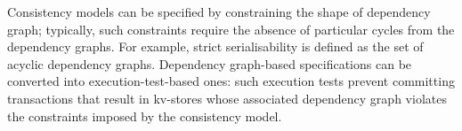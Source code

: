 Consistency models can be specified by constraining the shape of dependency graph; typically, such constraints require the absence of particular cycles 
from the dependency graphs. 
For example, strict serialisability is defined as the set of acyclic dependency graphs. %
Dependency graph-based specifications can be converted into execution-test-based ones: such execution 
tests prevent committing transactions that result in kv-stores whose associated dependency graph violates  
the constraints imposed by the consistency model.
%
%
